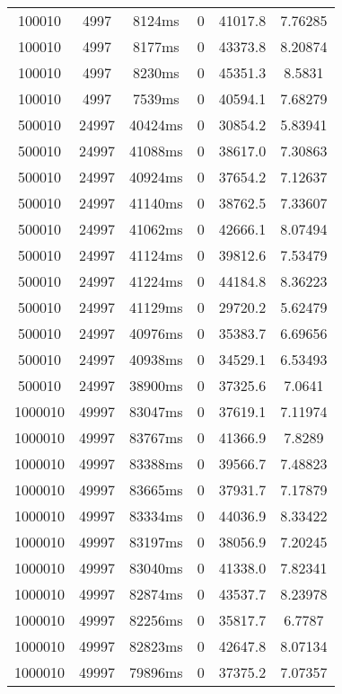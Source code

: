 \documentclass[./main.tex]{subfiles}
\begin{document}
\begin{table}
\begin{tabular}{ c | c | c | c | c | c }
        100010 & 4997 & 8124ms & 0 & 41017.8 & 7.76285 \\
        100010 & 4997 & 8177ms & 0 & 43373.8 & 8.20874 \\
        100010 & 4997 & 8230ms & 0 & 45351.3 & 8.5831 \\
        100010 & 4997 & 7539ms & 0 & 40594.1 & 7.68279 \\
        \hline
        500010 & 24997 & 40424ms & 0 & 30854.2 & 5.83941 \\
        500010 & 24997 & 41088ms & 0 & 38617.0 & 7.30863 \\
        \rowcolor{lightgray} 500010 & 24997 & 40924ms & 0 & 37654.2 & 7.12637 \\
        500010 & 24997 & 41140ms & 0 & 38762.5 & 7.33607 \\
        500010 & 24997 & 41062ms & 0 & 42666.1 & 8.07494 \\
        500010 & 24997 & 41124ms & 0 & 39812.6 & 7.53479 \\
        500010 & 24997 & 41224ms & 0 & 44184.8 & 8.36223 \\
        500010 & 24997 & 41129ms & 0 & 29720.2 & 5.62479 \\
        500010 & 24997 & 40976ms & 0 & 35383.7 & 6.69656 \\
        500010 & 24997 & 40938ms & 0 & 34529.1 & 6.53493 \\
        500010 & 24997 & 38900ms & 0 & 37325.6 & 7.0641 \\
        \hline
        1000010 & 49997 & 83047ms & 0 & 37619.1 & 7.11974 \\
        1000010 & 49997 & 83767ms & 0 & 41366.9 & 7.8289 \\
        \rowcolor{lightgray} 1000010 & 49997 & 83388ms & 0 & 39566.7 & 7.48823 \\
        1000010 & 49997 & 83665ms & 0 & 37931.7 & 7.17879 \\
        1000010 & 49997 & 83334ms & 0 & 44036.9 & 8.33422 \\
        1000010 & 49997 & 83197ms & 0 & 38056.9 & 7.20245 \\
        1000010 & 49997 & 83040ms & 0 & 41338.0 & 7.82341 \\
        1000010 & 49997 & 82874ms & 0 & 43537.7 & 8.23978 \\
        1000010 & 49997 & 82256ms & 0 & 35817.7 & 6.7787 \\
        1000010 & 49997 & 82823ms & 0 & 42647.8 & 8.07134 \\
        1000010 & 49997 & 79896ms & 0 & 37375.2 & 7.07357 \\

\end{tabular}
\end{table}
\end{document}
